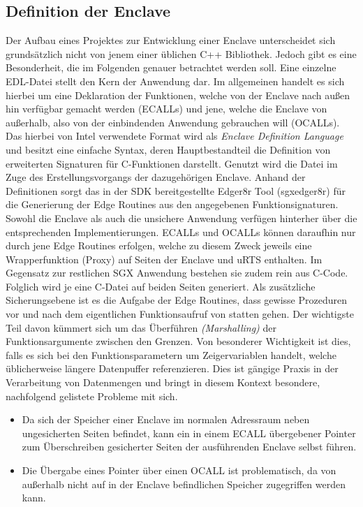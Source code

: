 \subsection{Definition der Enclave}
Der Aufbau eines Projektes zur Entwicklung einer Enclave unterscheidet sich grundsätzlich nicht von jenem einer üblichen C++ Bibliothek. Jedoch gibt es eine Besonderheit, die im Folgenden genauer betrachtet werden soll. Eine einzelne EDL-Datei stellt den Kern der Anwendung dar. Im allgemeinen handelt es sich hierbei um eine Deklaration der Funktionen, welche von der Enclave nach außen hin verfügbar gemacht werden (ECALLs) und jene, welche die Enclave von außerhalb, also von der einbindenden Anwendung gebrauchen will (OCALLs). Das hierbei von Intel verwendete Format wird als \textit{Enclave Definition Language} und besitzt eine einfache Syntax, deren Hauptbestandteil die Definition von erweiterten Signaturen für C-Funktionen darstellt. Genutzt wird die Datei im Zuge des Erstellungsvorgangs der dazugehörigen Enclave. Anhand der Definitionen sorgt das in der SDK bereitgestellte Edger8r Tool (sgx\textunderscore edger8r) für die Generierung der Edge Routines aus den angegebenen Funktionsignaturen. Sowohl die Enclave als auch die unsichere Anwendung verfügen hinterher über die entsprechenden Implementierungen. ECALLs und OCALLs können daraufhin nur durch jene Edge Routines erfolgen, welche zu diesem Zweck jeweils eine Wrapperfunktion (Proxy) auf Seiten der Enclave und uRTS enthalten. Im Gegensatz zur restlichen SGX Anwendung bestehen sie zudem rein aus C-Code. Folglich wird je eine C-Datei auf beiden Seiten generiert. Als zusätzliche Sicherungsebene ist es die Aufgabe der Edge Routines, dass gewisse Prozeduren vor und nach dem eigentlichen Funktionsaufruf von statten gehen. Der wichtigste Teil davon kümmert sich um das Überführen \textit{(Marshalling)} der Funktionsargumente zwischen den Grenzen. Von besonderer Wichtigkeit ist dies, falls es sich bei den Funktionsparametern um Zeigervariablen handelt, welche üblicherweise längere Datenpuffer referenzieren. Dies ist gängige Praxis in der Verarbeitung von Datenmengen und bringt in diesem Kontext besondere, nachfolgend gelistete Probleme mit sich.

\begin{itemize}
	\item Da sich der Speicher einer Enclave im normalen Adressraum neben ungesicherten Seiten befindet, kann ein in einem ECALL übergebener Pointer zum Überschreiben gesicherter Seiten der ausführenden Enclave selbst führen.
	\item Die Übergabe eines Pointer über einen OCALL ist problematisch, da von außerhalb nicht auf in der Enclave befindlichen Speicher zugegriffen werden kann.
\end{itemize}

